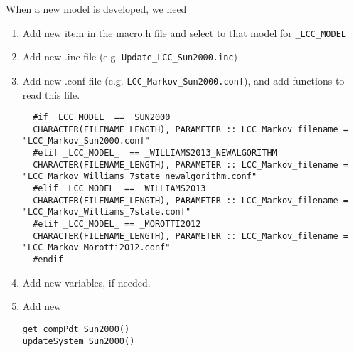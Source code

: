 When a new model is developed, we need 
\begin{enumerate}
  \item Add new item in the macro.h file and select to that model for
  \verb!_LCC_MODEL!
  
  \item Add new .inc file (e.g. \verb!Update_LCC_Sun2000.inc!)
  \item Add new .conf file (e.g. \verb!LCC_Markov_Sun2000.conf!), and add
  functions to read this file.
\begin{verbatim}
  #if _LCC_MODEL_ == _SUN2000                                                                                                                                                                                                  
  CHARACTER(FILENAME_LENGTH), PARAMETER :: LCC_Markov_filename = "LCC_Markov_Sun2000.conf"                                                                                                                                     
  #elif _LCC_MODEL_  == _WILLIAMS2013_NEWALGORITHM                                                                                                                                                                             
  CHARACTER(FILENAME_LENGTH), PARAMETER :: LCC_Markov_filename = "LCC_Markov_Williams_7state_newalgorithm.conf"                                                                                                                
  #elif _LCC_MODEL_ == _WILLIAMS2013                                                                                                                                                                                           
  CHARACTER(FILENAME_LENGTH), PARAMETER :: LCC_Markov_filename = "LCC_Markov_Williams_7state.conf"                                                                                                                             
  #elif _LCC_MODEL_ == _MOROTTI2012                                                                                                                                                                                            
  CHARACTER(FILENAME_LENGTH), PARAMETER :: LCC_Markov_filename = "LCC_Markov_Morotti2012.conf" 
  #endif
\end{verbatim}  

  \item Add new variables, if needed.
  \item Add new 
\begin{verbatim}
get_compPdt_Sun2000()
updateSystem_Sun2000()
\end{verbatim}  

\end{enumerate}